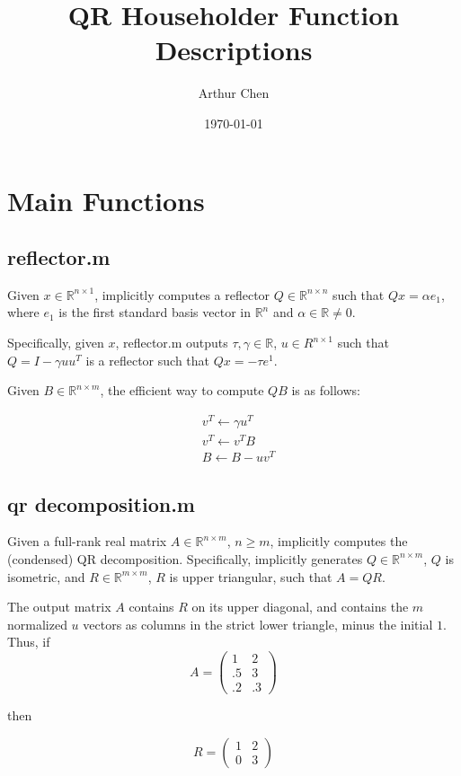 \documentclass{article}
\author{Arthur Chen}
\title{QR Householder Function Descriptions}
\date{\today}
\newcommand{\R}{\mathbb{R}}
\begin{document}
\maketitle

\section*{Main Functions}

\subsection*{reflector.m}

Given $x \in \R^{n \times 1}$, implicitly computes a reflector $Q \in \R^{n \times n}$ such that $Qx = \alpha e_1$, where $e_1$ is the first standard basis vector in $\R^n$ and $\alpha \in \R \neq 0$.

Specifically, given $x$, reflector.m outputs $\tau, \gamma \in \R$, $u \in R^{n \times 1}$ such that $Q = I - \gamma u u^T$ is a reflector such that $Qx = -\tau e^1$.

Given $B \in \R^{n \times m}$, the efficient way to compute $QB$ is as follows:

\begin{align*}
&v^T \leftarrow \gamma u^T \\
&v^T \leftarrow v^T B\\
&B \leftarrow B - uv^T
\end{align*}

\subsection*{qr decomposition.m}

Given a full-rank real matrix $A \in \R^{n \times m}$, $n \geq m$, implicitly computes the (condensed) QR decomposition. Specifically, implicitly generates $Q \in \R^{n \times m}$, $Q$ is isometric, and $R \in \R^{m \times m}$, $R$ is upper triangular, such that $A = QR$.

The output matrix $A$ contains $R$ on its upper diagonal, and contains the $m$ normalized $u$ vectors as columns in the strict lower triangle, minus the initial $1$. Thus, if
\[
A =
\begin{pmatrix}
1 & 2 \\
.5 & 3 \\
.2 & .3
\end{pmatrix}
\]

then

\[
R =
\begin{pmatrix}
1 & 2\\
0 & 3
\end{pmatrix}
\]
\end{document}
